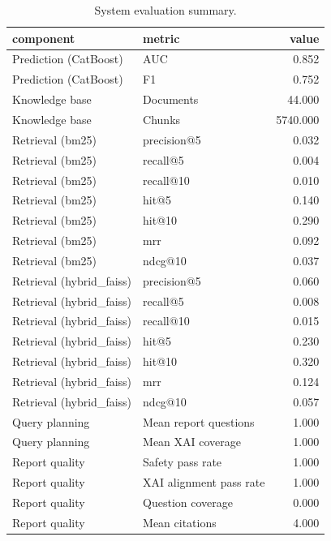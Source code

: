 \begin{table}
\caption{System evaluation summary.}
\label{tab:system_eval}
\begin{tabular}{llr}
\toprule
component & metric & value \\
\midrule
Prediction (CatBoost) & AUC & 0.852 \\
Prediction (CatBoost) & F1 & 0.752 \\
Knowledge base & Documents & 44.000 \\
Knowledge base & Chunks & 5740.000 \\
Retrieval (bm25) & precision@5 & 0.032 \\
Retrieval (bm25) & recall@5 & 0.004 \\
Retrieval (bm25) & recall@10 & 0.010 \\
Retrieval (bm25) & hit@5 & 0.140 \\
Retrieval (bm25) & hit@10 & 0.290 \\
Retrieval (bm25) & mrr & 0.092 \\
Retrieval (bm25) & ndcg@10 & 0.037 \\
Retrieval (hybrid_faiss) & precision@5 & 0.060 \\
Retrieval (hybrid_faiss) & recall@5 & 0.008 \\
Retrieval (hybrid_faiss) & recall@10 & 0.015 \\
Retrieval (hybrid_faiss) & hit@5 & 0.230 \\
Retrieval (hybrid_faiss) & hit@10 & 0.320 \\
Retrieval (hybrid_faiss) & mrr & 0.124 \\
Retrieval (hybrid_faiss) & ndcg@10 & 0.057 \\
Query planning & Mean report questions & 1.000 \\
Query planning & Mean XAI coverage & 1.000 \\
Report quality & Safety pass rate & 1.000 \\
Report quality & XAI alignment pass rate & 1.000 \\
Report quality & Question coverage & 0.000 \\
Report quality & Mean citations & 4.000 \\
\bottomrule
\end{tabular}
\end{table}

